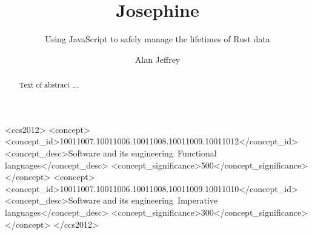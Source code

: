 \documentclass[acmsmall]{acmart}
\begin{document}
\title[Josephine]{Josephine} 
\subtitle{Using JavaScript to safely manage the lifetimes of Rust data}

\author{Alan Jeffrey}

\begin{abstract}
Text of abstract \ldots.
\end{abstract}

\begin{CCSXML}
<ccs2012>
<concept>
<concept_id>10011007.10011006.10011008.10011009.10011012</concept_id>
<concept_desc>Software and its engineering~Functional languages</concept_desc>
<concept_significance>500</concept_significance>
</concept>
<concept>
<concept_id>10011007.10011006.10011008.10011009.10011010</concept_id>
<concept_desc>Software and its engineering~Imperative languages</concept_desc>
<concept_significance>300</concept_significance>
</concept>
</ccs2012>
\end{CCSXML}



\maketitle





\appendix


\end{document}
